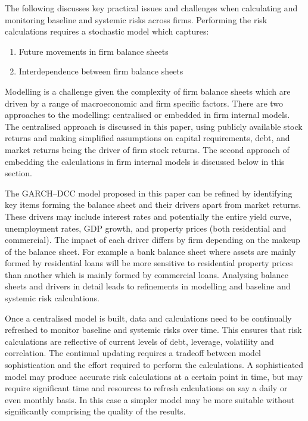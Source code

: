 \documentclass[authoryear]{elsarticle}
\renewcommand{\i}{\item}
\begin{document}
The following discusses key practical issues and challenges when calculating and monitoring baseline and systemic risks across firms. Performing the risk calculations requires a stochastic model which captures:
\begin{enumerate}
\i Future movements in firm balance sheets

\i Interdependence between firm balance sheets
\end{enumerate}
Modelling is a challenge given the complexity of firm balance sheets which are driven by a range of macroeconomic and firm specific factors. There are two approaches to the modelling: centralised or embedded in firm internal models. The centralised approach is discussed in this paper, using publicly available stock returns and making simplified assumptions on capital requirements, debt, and market returns being the driver of firm stock returns. The second approach of embedding the calculations in firm internal models is discussed below in this section.

The GARCH--DCC model proposed in this paper can be refined by identifying key items forming the balance sheet and their drivers apart from market returns. These drivers may include interest rates and potentially the entire yield curve, unemployment rates, GDP growth, and property prices (both residential and commercial). The impact of each driver differs by firm depending on the makeup of the balance sheet. For example a bank balance sheet where assets are mainly formed by residential loans will be more sensitive to residential property prices than another which is mainly formed by commercial loans. Analysing balance sheets and drivers in detail leads to refinements in modelling and baseline and systemic risk calculations.

Once a centralised model is built, data and calculations need to be continually refreshed to monitor baseline and systemic risks over time. This ensures that risk calculations are reflective of current levels of debt, leverage, volatility and correlation. The continual updating requires a tradeoff between model sophistication and the effort required to perform the calculations. A sophisticated model may produce accurate risk calculations at a certain point in time, but may require significant time and resources to refresh calculations on say a daily or even monthly basis. In this case a simpler model may be more suitable without significantly comprising the quality of the results.
\end{document}
